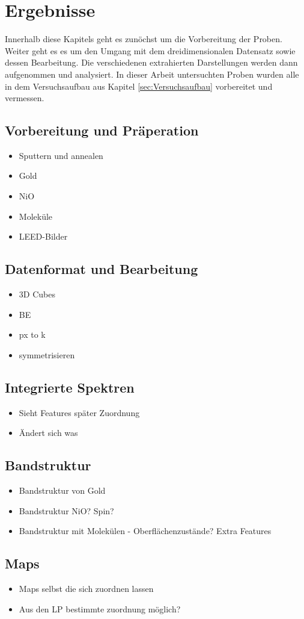 \chapter{Ergebnisse}
    Innerhalb diese Kapitels geht es zunöchst um die Vorbereitung der Proben.
    Weiter geht es es um den Umgang mit dem dreidimensionalen Datensatz sowie dessen Bearbeitung.
    Die verschiedenen extrahierten Darstellungen werden dann aufgenommen und analysiert.
    In dieser Arbeit untersuchten Proben wurden alle in dem Versuchsaufbau aus Kapitel \ref{sec:Versuchsaufbau} vorbereitet und vermessen.

    \section{Vorbereitung und Präperation}
        \begin{itemize}
            \item Sputtern und annealen
            \item Gold
            \item NiO
            \item Moleküle
            \item LEED-Bilder
        \end{itemize}

    \section{Datenformat und Bearbeitung}
        \begin{itemize}
            \item 3D Cubes
            \item BE 
            \item px to k
            \item symmetrisieren
        \end{itemize}

    \section{Integrierte Spektren}
        \begin{itemize}
            \item Sieht Features später Zuordnung
            \item Ändert sich was
        \end{itemize}

    \section{Bandstruktur}
        \begin{itemize}
            \item Bandstruktur von Gold
            \item Bandstruktur NiO? Spin?
            \item Bandstruktur mit Molekülen - Oberflächenzustände? Extra Features
        \end{itemize}

    \section{Maps}
        \begin{itemize}
            \item Maps selbst die sich zuordnen lassen
            \item Aus den LP bestimmte zuordnung möglich?
        \end{itemize}